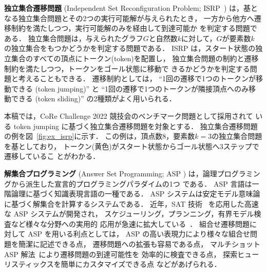 \textbf{独立集合遷移問題}
(Independent Set Reconfiguration Problem; ISRP~\cite{core:ItoDHPSUU11})
は，基となる独立集合問題とその2つの実行可能解が与えられたとき，
一方から他方へ遷移制約を満たしつつ，実行可能解のみを経由して到達可能か
を判定する問題である．
独立集合問題は，与えられたグラフ$G$と自然数$k$に対して，$G$が要素数$k$
の独立集合をもつかどうかを判定する問題である．
ISRP は，スタート状態の独立集合のすべての頂点にトークン(token)を配置し，
独立集合問題の制約と遷移制約を満たしつつ，トークンをゴール状態に移動で
きるかどうかを判定する問題と考えることもできる．
遷移制約としては，
``1回の遷移で1つのトークンが移動できる (token jumping)''  と
``1回の遷移で1つのトークンが隣接頂点へのみ移動できる (token sliding)'' 
の2種類がよく用いられる．

本稿では，CoRe Challenge 2022 競技会のベンチマーク問題として採用されて
いる token jumping に基づく独立集合遷移問題を対象とする．
独立集合遷移問題の例を図~\ref{fig:ex_isrp}に示す．
この例は，頂点数8，要素数$k=3$の独立集合問題を基としており，
トークン(黄色)がスタート状態からゴール状態へ3ステップで遷移しているこ
とがわかる．

\textbf{解集合プログラミング}
(Answer Set Programming; ASP \cite{%
  Gelfond88:iclp,
  Niemela99:amai,
  Baral03:cambridge,
  Inoue08:jssst})
は，論理プログラミングから派生した宣言的プログラミングパラダイムの1つ
である．
ASP 言語は一階論理に基づく知識表現言語の一種である．
ASP システムは安定モデル意味論に基づく解集合を計算するシステムである．
近年，SAT 技術~\cite{Knuth:TAOCP:SAT}
を応用した高速な ASP システムが開発され，
スケジューリング，プランニング，有界モデル検査など様々な分野への実用的
応用が急速に拡大している~\cite{Erdem16:AI,anor/Banbara2019}．
%
組合せ遷移問題に対して ASP を用いる利点としては，
ASP の高い表現力により様々な組合せ問題を簡潔に記述できる点，
遷移問題への拡張も容易である点，
マルチショット ASP 解法~\cite{GebserKKS19}により遷移問題の到達可能性を
効率的に検査できる点，
探索ヒューリスティックスを簡単にカスタマイズできる点
などがあげられる．

